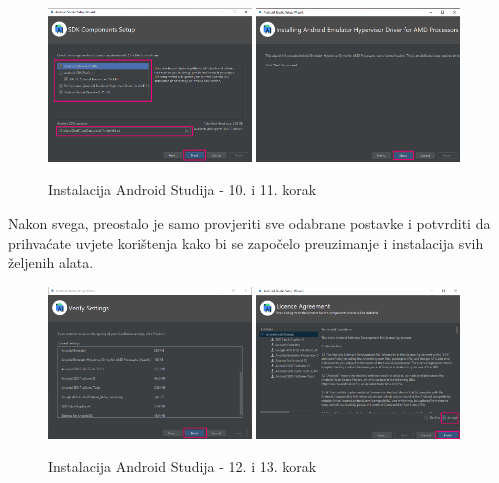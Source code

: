 \documentclass[11pt,a4paper,twoside]{article}
\begin{document}
	\begin{figure}[!h]
		\centering
		\includegraphics[width=0.48\textwidth]{install_10.png}
		\hfill
		\includegraphics[width=0.48\textwidth]{install_11.png}
		\caption{Instalacija Android Studija - 10. i 11. korak}
		\label{fig:install_10}	
	\end{figure}

	Nakon svega, preostalo je samo provjeriti sve odabrane postavke i potvrditi da prihvaćate uvjete korištenja kako bi se započelo preuzimanje i instalacija svih željenih alata.
		
	\begin{figure}[!h]
		\centering
		\includegraphics[width=0.48\textwidth]{install_12.png}
		\hfill
		\includegraphics[width=0.48\textwidth]{install_13.png}
		\caption{Instalacija Android Studija - 12. i 13. korak}
		\label{fig:install_12}	
	\end{figure}
\end{document}
